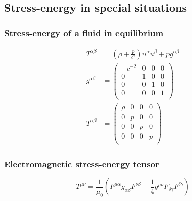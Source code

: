%
%
\subsection{Stress-energy in special situations}
\subsubsection{Stress-energy of a fluid in equilibrium}
\begin{align}
  T^{\alpha \beta }
    & = \left( \rho + \frac{p}{c^2} \right) u^{\alpha } u^{\beta } + p g^{\alpha \beta } \\
  g^{\alpha \beta }
    & = \left(
      \begin{array}{cccc}
        -{c}^{-2} & 0 & 0 & 0 \\
        0 & 1 & 0 & 0 \\
        0 & 0 & 1 & 0 \\
        0 & 0 & 0 & 1 \\
      \end{array}
    \right) \\
  T^{\alpha \beta }
    & = \left(
      \begin{array}{cccc}
        \rho & 0 & 0 & 0 \\
        0 & p & 0 & 0 \\
        0 & 0 & p & 0 \\
        0 & 0 & 0 & p \\
      \end{array}
    \right)
\end{align}


\subsubsection{Electromagnetic stress-energy tensor}
\begin{equation}
  T^{\mu \nu }
    = \frac{1}{{\mu }_0} \left( F^{\mu \alpha } g_{\alpha \beta } F^{\nu \beta }
        - \frac{1}{4} g^{\mu \nu } F_{\delta \gamma } F^{\delta \gamma } \right)
\end{equation}
